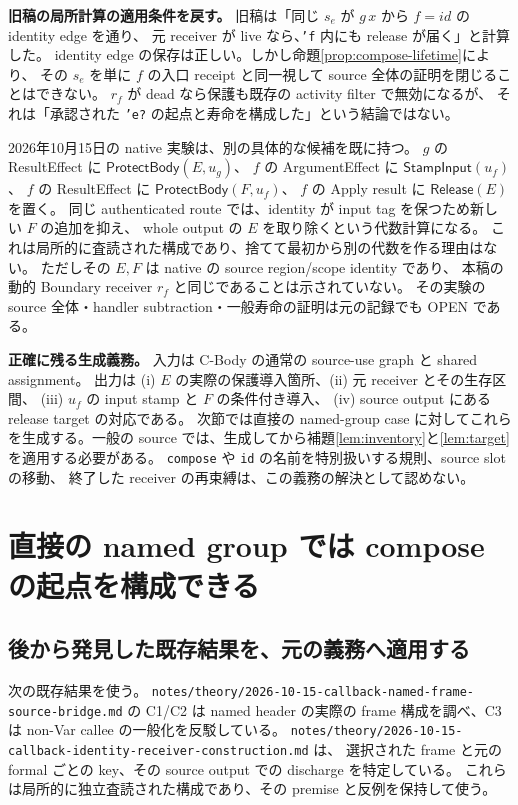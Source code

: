 \documentclass[11pt,a4paper]{article}
\begin{document}
\textbf{旧稿の局所計算の適用条件を戻す。}
旧稿は「同じ \(s_e\) が \(g\,x\) から \(f=id\) の identity edge を通り、
元 receiver が live なら、\texttt{'f} 内にも release が届く」と計算した。
identity edge の保存は正しい。しかし命題\ref{prop:compose-lifetime}により、
その \(s_e\) を単に \(f\) の入口 receipt と同一視して source 全体の証明を閉じることはできない。
\(r_f\) が dead なら保護も既存の activity filter で無効になるが、
それは「承認された \texttt{'e?} の起点と寿命を構成した」という結論ではない。

2026年10月15日の native 実験は、別の具体的な候補を既に持つ。
\(g\) の ResultEffect に \(\mathsf{ProtectBody}(E,u_g)\)、
\(f\) の ArgumentEffect に \(\mathsf{StampInput}(u_f)\)、
\(f\) の ResultEffect に \(\mathsf{ProtectBody}(F,u_f)\)、
\(f\) の Apply result に \(\mathsf{Release}(E)\) を置く。
同じ authenticated route では、identity が input tag を保つため新しい \(F\) の追加を抑え、
whole output の \(E\) を取り除くという代数計算になる。
これは局所的に査読された構成であり、捨てて最初から別の代数を作る理由はない。
ただしその \(E,F\) は native の source region/scope identity であり、
本稿の動的 Boundary receiver \(r_f\) と同じであることは示されていない。
その実験の source 全体・handler subtraction・一般寿命の証明は元の記録でも OPEN である。

\textbf{正確に残る生成義務。}
入力は C-Body の通常の source-use graph と shared assignment。
出力は (i) \(E\) の実際の保護導入箇所、(ii) 元 receiver とその生存区間、
(iii) \(u_f\) の input stamp と \(F\) の条件付き導入、
(iv) source output にある release target の対応である。
次節では直接の named-group case に対してこれらを生成する。一般の source では、生成してから補題\ref{lem:inventory}と\ref{lem:target}を適用する必要がある。
\texttt{compose} や \texttt{id} の名前を特別扱いする規則、source slot の移動、
終了した receiver の再束縛は、この義務の解決として認めない。

\section{直接の named group では compose の起点を構成できる}
\label{sec:named}

\subsection{後から発見した既存結果を、元の義務へ適用する}

次の既存結果を使う。
\nolinkurl{notes/theory/2026-10-15-callback-named-frame-source-bridge.md} の C1/C2 は
named header の実際の frame 構成を調べ、C3 は non-Var callee の一般化を反駁している。
\nolinkurl{notes/theory/2026-10-15-callback-identity-receiver-construction.md} は、
選択された frame と元の formal ごとの key、その source output での discharge を特定している。
これらは局所的に独立査読された構成であり、その premise と反例を保持して使う。
\end{document}
